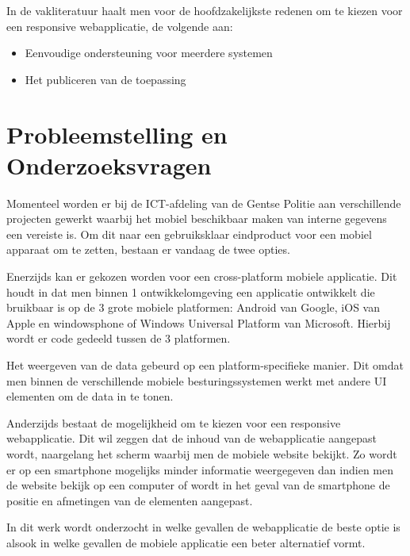 In de vakliteratuur haalt men voor de hoofdzakelijkste redenen om te kiezen voor een responsive webapplicatie, de volgende aan:
\begin{itemize}
  \item{Eenvoudige ondersteuning voor meerdere systemen}
  \item{Het publiceren van de toepassing}
\end{itemize}



\section{Probleemstelling en Onderzoeksvragen}
\label{sec:onderzoeksvragen}


Momenteel worden er bij de ICT-afdeling van de Gentse Politie aan verschillende projecten gewerkt waarbij het
mobiel beschikbaar maken van interne gegevens een vereiste is.
Om dit naar een gebruiksklaar eindproduct voor een mobiel apparaat om te zetten, bestaan er vandaag de twee opties.

Enerzijds kan er gekozen worden voor een cross-platform mobiele applicatie.
Dit houdt in dat men binnen 1 ontwikkelomgeving een applicatie ontwikkelt die bruikbaar is op de
3 grote mobiele platformen: Android van Google, iOS van Apple en windowsphone of
Windows Universal Platform van Microsoft.
Hierbij wordt er code gedeeld tussen de 3 platformen.

Het weergeven van de data gebeurd op een platform-specifieke manier.
Dit omdat men binnen de verschillende mobiele besturingssystemen werkt met andere UI elementen om de data in te tonen.

Anderzijds bestaat de mogelijkheid om te kiezen voor een responsive webapplicatie.
Dit wil zeggen dat de inhoud van de webapplicatie aangepast wordt,
 naargelang het scherm waarbij men de mobiele website bekijkt.
Zo wordt er op een smartphone mogelijks minder informatie weergegeven dan indien men de website bekijk op een computer of
wordt in het geval van de smartphone de positie en afmetingen van de elementen aangepast.

In dit werk wordt onderzocht in welke gevallen de webapplicatie de beste optie is alsook in welke gevallen de mobiele applicatie
een beter alternatief vormt.

